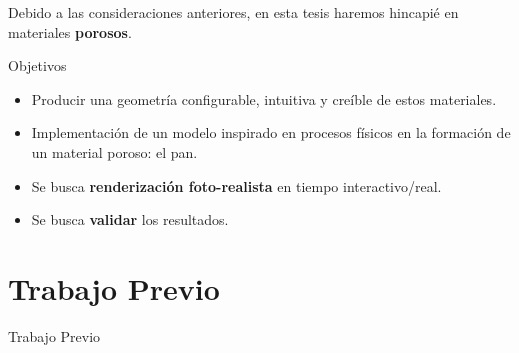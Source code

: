 \documentclass[spanish,unknownkeysallowed]{beamer}
\begin{document}
\begin{frame}
\begin{block}{}
Debido a las consideraciones anteriores, en esta tesis haremos hincapié en materiales \textbf{porosos}.

Objetivos
\begin{itemize}
\item Producir una geometría configurable, intuitiva y creíble de estos materiales.
\item Implementación de un modelo inspirado en procesos físicos en la formación de un material poroso: el pan.
\item Se busca \textbf{renderización foto-realista} en tiempo interactivo/real.
\item Se busca \textbf{validar} los resultados.
\end{itemize}



\end{block}
\end{frame}




\section{Trabajo Previo}

\begin{frame}
\begin{block}{}
\begin{center}
\vspace{1cm}
\huge{Trabajo Previo}
\vspace{1cm}
\end{center}
\end{block}
\end{frame}
\end{document}
